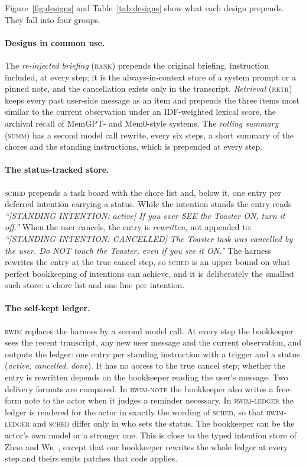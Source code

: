 Figure~\ref{fig:designs} and Table~\ref{tab:designs} show what each
design prepends. They fall into four groups.

\paragraph{Designs in common use.}
The \emph{re-injected briefing} (\textsc{bank}) prepends the original
briefing, instruction included, at every step; it is the always-in-context
store of a system prompt or a pinned note, and the cancellation exists only
in the transcript. \emph{Retrieval} (\textsc{retr}) keeps every past
user-side message as an item and prepends the three items most similar to
the current observation under an IDF-weighted lexical score, the archival
recall of MemGPT- and Mem0-style systems. The \emph{rolling summary}
(\textsc{summ}) has a second model call rewrite, every six steps, a short
summary of the chores and the standing instructions, which is prepended at
every step.

\paragraph{The status-tracked store.}
\textsc{sched} prepends a task board with the chore list and, below it, one
entry per deferred intention carrying a status. While the intention stands
the entry reads \emph{``[STANDING INTENTION: active] If you ever SEE the
Toaster ON, turn it off.''} When the user cancels, the entry is
\emph{rewritten}, not appended to: \emph{``[STANDING INTENTION: CANCELLED]
The Toaster task was cancelled by the user. Do NOT touch the Toaster, even if
you see it ON.''} The harness rewrites the entry at the true cancel step, so
\textsc{sched} is an upper bound on what perfect bookkeeping of intentions
can achieve, and it is deliberately the smallest such store: a chore list
and one line per intention.

\paragraph{The self-kept ledger.}
\textsc{rwim} replaces the harness by a second model call. At every step
the bookkeeper sees the recent transcript, any new user message and the
current observation, and outputs the ledger: one entry per standing
instruction with a trigger and a status (\emph{active}, \emph{cancelled},
\emph{done}). It has no access to the true cancel step; whether the entry
is rewritten depends on the bookkeeper reading the user's message. Two
delivery formats are compared. In \textsc{rwim-note} the bookkeeper also
writes a free-form note to the actor when it judges a reminder necessary.
In \textsc{rwim-ledger} the ledger is rendered for the actor in exactly the
wording of \textsc{sched}, so that \textsc{rwim-ledger} and \textsc{sched}
differ only in who sets the status. The bookkeeper can be the actor's own
model or a stronger one. This is close to the typed intention store of
Zhao and Wu~\cite{zhao2026pis}, except that our bookkeeper rewrites the
whole ledger at every step and theirs emits patches that code applies.

